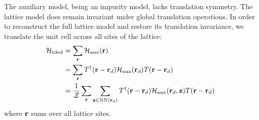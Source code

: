 \documentclass[reprint,hidelinks]{revtex4-2}
\begin{document}
The auxiliary model, being an impurity model, lacks translation symmetry. The lattice model does remain invariant under global translation operations. In order to reconstruct the full lattice model and restore its translation invariance, we translate the unit cell across all sites of the lattice:
\begin{equation}\begin{aligned}
	\label{tilingPrescription}
	\mathcal{H}_\text{tiled} &= \sum_{{\bf r}}\mathcal{H}_\text{aux}({\bf r})\\
				&= \sum_{{\bf r}}T^\dagger({\bf r} - {\bf r}_d)\mathcal{H}_\text{aux}({\bf r}_d)T({\bf r} - {\bf r}_d)~ \\
				&= \frac{1}{\mathcal{Z}}\sum_{{\bf r}}\sum_{{\bf z}\in\text{NN}({\bf r}_d)}T^\dagger({\bf r} - {\bf r}_d)\mathcal{H}_\text{aux}({\bf r}_d, {\bf z})T({\bf r} - {\bf r}_d)~ \\
\end{aligned}\end{equation}
where \({\bf r}\) sums over all lattice sites.
\end{document}
